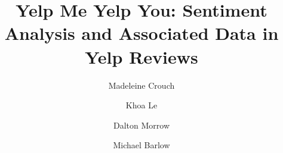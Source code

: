 \documentclass[acmsmall]{acmart}
\begin{document}
\title{Yelp Me Yelp You: Sentiment Analysis and Associated Data in Yelp Reviews} 
\author{Madeleine Crouch}
\author{Khoa Le}
\author{Dalton Morrow}
\author{Michael Barlow}



\maketitle

\renewcommand{\shortauthors}{M. Crouch et al.}


\end{document}
